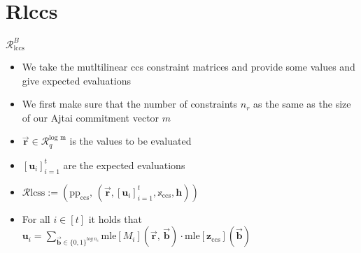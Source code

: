 \section{Rlccs}
\begin{frame}
    {$\mathcal{R}^B_{\text{lccs}}$}
    \begin{itemize}
        \item We take the mutltilinear ccs constraint matrices and provide some values and give expected evaluations
        \item We first make sure that the number of constraints $n_r$ as the same as the size of our Ajtai commitment vector $m$
        \item $\overrightarrow{\textbf{r}} \in \mathcal{R}^{\text{log m}}_{q}$ is the values to be evaluated
        \item $ [\textbf{u}_i]^{t}_{i=1}$ are the expected evaluations
        \item $\mathcal{R}{\text{lcss}} := (\text{pp}_{\text{ccs}},\, (\overrightarrow{\textbf{r}}, [\textbf{u}_i]^{t}_{i=1}, \mathbb{x}_{\text{ccs}}, \textbf{h}))$
        \item For all $i \in [t]$ it holds that $\textbf{u}_i = \sum_{\overrightarrow{\textbf{b}} \in \{0, 1\}^{log\ n_{c}}} \text{mle}[M_{i}](\overrightarrow{\textbf{r}},\,\overrightarrow{\textbf{b}}) \cdot \text{mle}[\textbf{z}_{\text{ccs}}](\overrightarrow{\textbf{b}})$
    \end{itemize}
\end{frame}